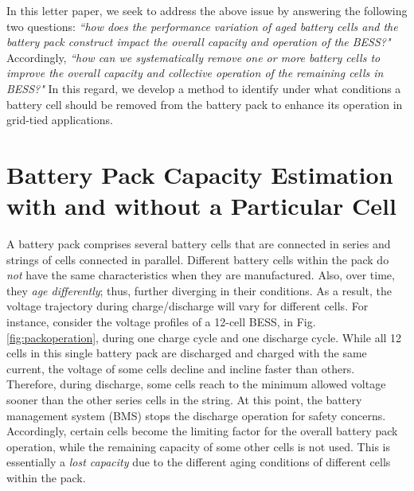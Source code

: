 \documentclass[10pt,twocolumn]{IEEEtran}
\begin{document}
In this letter paper, we seek to address the above issue by answering the following two questions: 
\emph{``how does the performance variation of aged  battery cells and the battery pack construct  impact the overall capacity and operation of the BESS?"} 
 Accordingly, \emph{``how can we systematically remove one or more battery cells to improve the overall capacity and collective operation of the remaining cells in BESS?"} 
In this regard, we develop a method to identify under what conditions a battery cell  should be removed  from the battery pack to  enhance its operation in grid-tied applications.   




\section{Battery Pack Capacity  Estimation with and without a Particular Cell}

A  battery pack comprises several battery  cells that are connected in series and strings of cells  connected in parallel. 
Different battery  cells within the pack do \emph{not} have the same characteristics when they are manufactured.
 Also, over time, they \emph{age differently}; thus, further  diverging in their  conditions.
As a result,  the voltage trajectory during charge/discharge will vary for different cells.
For instance, consider the voltage profiles of a 12-cell BESS,   in Fig. \ref{fig:packoperation}, during one charge  cycle and one discharge cycle.
While all 12 cells in this single battery pack are discharged and charged with the same current, the voltage of some cells decline and incline faster than others.
%
%
Therefore, during discharge, some cells  reach to the minimum allowed voltage sooner than the other series cells in the  string.
At this point,  the battery management system (BMS) stops the discharge operation for safety concerns.
Accordingly, certain cells become the limiting factor for the overall  battery pack operation, 
while the remaining capacity of some other cells is not used. 
This is essentially a \emph{lost capacity} due to the different aging conditions of different cells within the pack. 
\end{document}
